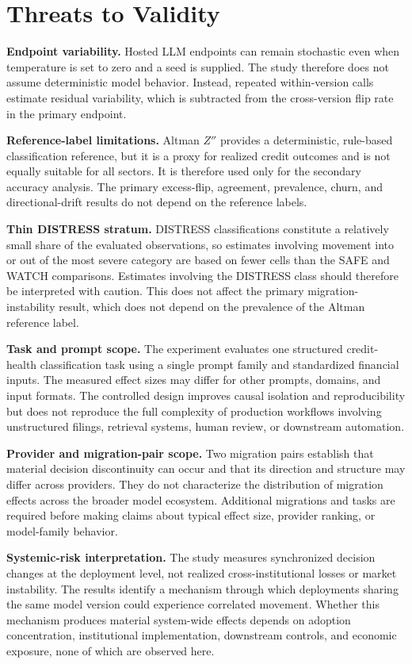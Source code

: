 \documentclass[11pt]{article}
\begin{document}
\section{Threats to Validity}
\noindent\textbf{Endpoint variability.} Hosted LLM endpoints can remain stochastic even when temperature is set to zero and a seed is supplied. The study therefore does not assume deterministic model behavior. Instead, repeated within-version calls estimate residual variability, which is subtracted from the cross-version flip rate in the primary endpoint.

\noindent\textbf{Reference-label limitations.} Altman $Z''$ provides a deterministic, rule-based classification reference, but it is a proxy for realized credit outcomes and is not equally suitable for all sectors. It is therefore used only for the secondary accuracy analysis. The primary excess-flip, agreement, prevalence, churn, and directional-drift results do not depend on the reference labels.

\noindent\textbf{Thin DISTRESS stratum.} DISTRESS classifications constitute a relatively small share of the evaluated observations, so estimates involving movement into or out of the most severe category are based on fewer cells than the SAFE and WATCH comparisons. Estimates involving the DISTRESS class should therefore be interpreted with caution. This does not affect the primary migration-instability result, which does not depend on the prevalence of the Altman reference label.

\noindent\textbf{Task and prompt scope.} The experiment evaluates one structured credit-health classification task using a single prompt family and standardized financial inputs. The measured effect sizes may differ for other prompts, domains, and input formats. The controlled design improves causal isolation and reproducibility but does not reproduce the full complexity of production workflows involving unstructured filings, retrieval systems, human review, or downstream automation.

\noindent\textbf{Provider and migration-pair scope.} Two migration pairs establish that material decision discontinuity can occur and that its direction and structure may differ across providers. They do not characterize the distribution of migration effects across the broader model ecosystem. Additional migrations and tasks are required before making claims about typical effect size, provider ranking, or model-family behavior.

\noindent\textbf{Systemic-risk interpretation.} The study measures synchronized decision changes at the deployment level, not realized cross-institutional losses or market instability. The results identify a mechanism through which deployments sharing the same model version could experience correlated movement. Whether this mechanism produces material system-wide effects depends on adoption concentration, institutional implementation, downstream controls, and economic exposure, none of which are observed here.
\end{document}
